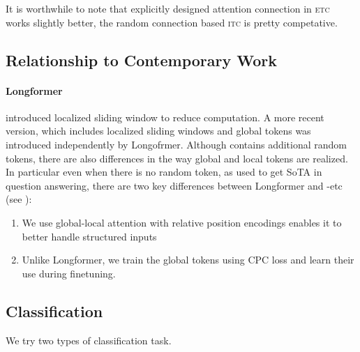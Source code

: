 It is worthwhile to note that explicitly designed attention connection in \textsc{etc} works slightly better, the random connection based \textsc{itc} is pretty competative.

\subsection{Relationship to Contemporary Work} \label{sec:app-related-work}

\paragraph{Longformer}
\citet{child2019generating} introduced localized sliding window to reduce computation.
A more recent version, which includes localized sliding windows and global tokens was introduced independently by
Longofrmer\citep{beltagy2020longformer}. Although \bigb contains additional random tokens, there are also differences in the way global and local tokens are realized. In particular even when there is no random token, as used to get SoTA in question answering, there are two key differences between Longformer and \bigb-etc (see \citep{ainslie2020etc}):
\begin{enumerate}
    \item We use global-local attention with relative
position encodings enables it to better handle structured inputs
    \item Unlike Longformer, we train the global tokens using CPC loss and learn their use during finetuning.
\end{enumerate}

\subsection{Classification}
\label{sec:app-expt-nlp:cls}
We try two types of classification task.

